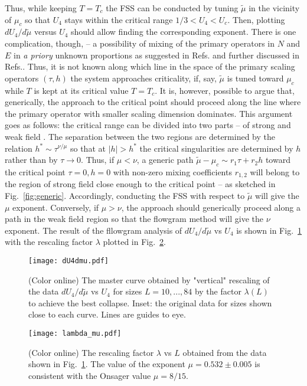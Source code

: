 \documentclass[prb,aps,twocolumn,groupedaddress,floats,showpacs,final]{revtex4}
\begin{document}
Thus, while keeping $T=T_c$ the FSS can be conducted by tuning $\tilde{\mu}$ in the vicinity of $\mu_c$ so that
$U_4$ stays within the critical range $1/3 < U_4 <U_c$. Then, plotting $dU_4/d\tilde{\mu}$ versus $U_4$ should allow finding
the corresponding exponent.
There is one complication, though, -- a possibility of mixing of the primary operators in $N$ and $E$ in {\it a priory} unknown proportions as suggested in Refs.\cite{Mermin,Pokrovskii,Patashin} and further discussed in Refs.\cite{Fisher2000,Fisher_2001,Fisher_2003,Fisher_2003_2}. Thus, it is not known along which line in the space of the primary scaling operators  $(\tau,h)$ the system approaches criticality, if, say, $\tilde{\mu}$ is tuned toward $\mu_c$ while $T$ is kept  at its critical value $T=T_c$.
It is, however, possible to argue that, generically, the approach to the critical point should proceed along the line where the primary operator with smaller scaling dimension dominates. This argument goes as follows: the critical range can be divided into two parts -- of strong and weak field \cite{Landau}. The separation between the two regions are determined by the relation $h^*\sim \tau^{\nu/\mu}$ so that at $|h|>h^*$ the critical singularities are determined by $h$ rather than by $\tau \to 0$. Thus, if $\mu <\nu$, a generic path $\tilde{\mu} - \mu_c \sim r_1 \tau + r_2 h$ toward the critical point $\tau=0,h=0$  with non-zero mixing coefficients $r_{1,2}$ will belong to the region of strong field close enough to the critical point -- as sketched in Fig.~\ref{fig:generic}. Accordingly, conducting the FSS with respect to $\tilde{\mu}$ will give
the $\mu$ exponent. Conversely, if $\mu > \nu$, the approach should generically proceed along a path in the weak field region so that the
flowgram method will give the $\nu$ exponent.    The result of the fllowgram analysis of $dU_4/d\tilde{\mu}$ vs $U_4$
is shown in Fig.~\ref{fig:dU4} with the rescaling factor $\lambda$ plotted in Fig.~\ref{fig:lamb_mu}.
\begin{figure}
\vspace*{-0.5cm}
 \texttt{[image: dU4dmu.pdf]}
\vskip-8mm
\caption{(Color online) 
The master curve obtained by "vertical" rescaling  of the data $dU_4/d\tilde{\mu}$ vs $U_4$ for sizes $L=10,...,84$ by the factor $\lambda(L)$ to achieve the best collapse. Inset: the original data for sizes shown close to each curve. Lines are guides to eye. }
\label{fig:dU4}
\end{figure}
\begin{figure}
 \texttt{[image: lambda\_mu.pdf]}
\caption{(Color online) The rescaling factor $\lambda$ vs $L$ obtained from the data shown in Fig.~\ref{fig:dU4}. The value of the exponent $\mu=0.532 \pm 0.005$ is consistent with the Onsager value $\mu=8/15$. }
\label{fig:lamb_mu}
\end{figure}
\end{document}
